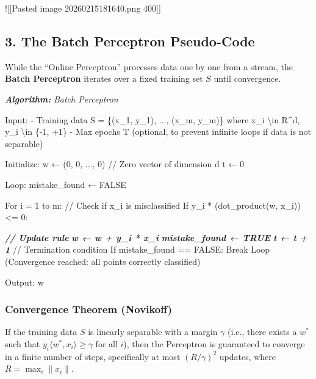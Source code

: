 \documentclass[
  italian,
  11pt,
]{article}
\newenvironment{Shaded}{}{}
\newcommand{\AnnotationTok}[1]{\textcolor[rgb]{0.38,0.63,0.69}{\textbf{\textit{#1}}}}
\newcommand{\CommentTok}[1]{\textcolor[rgb]{0.38,0.63,0.69}{\textit{#1}}}
\newcommand{\InformationTok}[1]{\textcolor[rgb]{0.38,0.63,0.69}{\textbf{\textit{#1}}}}
\newcommand{\NormalTok}[1]{#1}
\newcommand{\SpecialStringTok}[1]{\textcolor[rgb]{0.73,0.40,0.53}{#1}}
\begin{document}
!{[}{[}Pasted image 20260215181640.png \textbar{} 400{]}{]}

\subsection{3. The Batch Perceptron
Pseudo-Code}\label{the-batch-perceptron-pseudo-code}

While the ``Online Perceptron'' processes data one by one from a stream,
the \textbf{Batch Perceptron} iterates over a fixed training set \(S\)
until convergence.

\begin{Shaded}
\begin{Highlighting}[]
\AnnotationTok{Algorithm:}\CommentTok{ Batch Perceptron}

\NormalTok{Input: }
\SpecialStringTok{  {-} }\NormalTok{Training data S = \{(x\_1, y\_1), ..., (x\_m, y\_m)\} where x\_i \textbackslash{}in R\^{}d, y\_i \textbackslash{}in \{{-}1, +1\}}
\SpecialStringTok{  {-} }\NormalTok{Max epochs T (optional, to prevent infinite loops if data is not separable)}

\NormalTok{Initialize:}
\NormalTok{  w ← (0, 0, ..., 0)  // Zero vector of dimension d}
\NormalTok{  t ← 0}

\NormalTok{Loop:}
\NormalTok{  mistake\_found ← FALSE}
  
\NormalTok{  For i = 1 to m:}
\NormalTok{    // Check if x\_i is misclassified}
\NormalTok{    If y\_i * (dot\_product(w, x\_i)) \textless{}= 0:}
      
\InformationTok{      // Update rule}
\InformationTok{      w ← w + y\_i * x\_i}
\InformationTok{      }
\InformationTok{      mistake\_found ← TRUE}
\InformationTok{      t ← t + 1}
\InformationTok{      }
\NormalTok{  // Termination condition}
\NormalTok{  If mistake\_found == FALSE:}
\NormalTok{    Break Loop (Convergence reached: all points correctly classified)}

\NormalTok{Output: w}
\end{Highlighting}
\end{Shaded}

\subsubsection{Convergence Theorem
(Novikoff)}\label{convergence-theorem-novikoff}

If the training data \(S\) is linearly separable with a margin
\(\gamma\) (i.e., there exists a \(w^*\) such that
\(y_i \langle w^*, x_i \rangle \ge \gamma\) for all \(i\)), then the
Perceptron is guaranteed to converge in a finite number of steps,
specifically at most \((R/\gamma)^2\) updates, where
\(R = \max_i \|x_i\|\).
\end{document}
